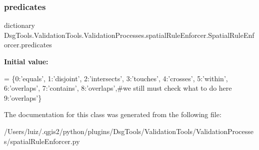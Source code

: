\subsubsection{\texorpdfstring{predicates}{predicates}}
{\footnotesize\ttfamily dictionary Dsg\+Tools.\+Validation\+Tools.\+Validation\+Processes.\+spatial\+Rule\+Enforcer.\+Spatial\+Rule\+Enforcer.\+predicates\hspace{0.3cm}{\ttfamily [static]}}

{\bfseries Initial value\+:}
\begin{DoxyCode}
=  \{0:\textcolor{stringliteral}{'equals'},
                  1:\textcolor{stringliteral}{'disjoint'},
                  2:\textcolor{stringliteral}{'intersects'},
                  3:\textcolor{stringliteral}{'touches'},
                  4:\textcolor{stringliteral}{'crosses'},
                  5:\textcolor{stringliteral}{'within'},
                  6:\textcolor{stringliteral}{'overlaps'},
                  7:\textcolor{stringliteral}{'contains'},
                  8:\textcolor{stringliteral}{'overlaps'},\textcolor{comment}{#we still must check what to do here}
                  9:\textcolor{stringliteral}{'overlaps'}\}
\end{DoxyCode}


The documentation for this class was generated from the following file\+:\begin{DoxyCompactItemize}
\item 
/\+Users/luiz/.\+qgis2/python/plugins/\+Dsg\+Tools/\+Validation\+Tools/\+Validation\+Processes/spatial\+Rule\+Enforcer.\+py\end{DoxyCompactItemize}
